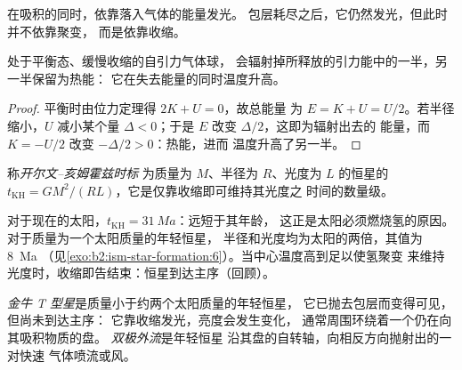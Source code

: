 \begin{omfigure}
\par{}
\end{omfigure}

在吸积的同时，依靠落入气体的能量发光。
包层耗尽之后，它仍然发光，但此时并不依靠聚变，
而是依靠收缩。

\begin{proposition}[收缩为年轻恒星提供能量]
\label{prop:b2:ism-star-formation:contraction}
处于平衡态、缓慢收缩的自引力气体球，
会辐射掉所释放的引力能中的一半，另一半保留为热能：
它在失去能量的同时温度升高。
\end{proposition}

\begin{proof}
平衡时由位力定理得 $2K + U = 0$，故总能量
为 $E = K + U = U/2$。若半径缩小，$U$ 减小某个量
$\Delta < 0$；于是 $E$ 改变 $\Delta/2$，这即为辐射出去的
能量，而 $K = -U/2$ 改变 $-\Delta/2 > 0$：热能，进而
温度升高了另一半。
\end{proof}

\begin{definition}\label{def:b2:ism-star-formation:kh-time}
称\emph{开尔文–亥姆霍兹时标}
为质量为 $M$、半径为 $R$、光度为 $L$ 的恒星的
$t_{\mathrm{KH}} = GM^2/(RL)$，它是仅靠收缩即可维持其光度之
时间的数量级。
\end{definition}

对于现在的太阳，$t_{\mathrm{KH}} = \qty{31}{Ma}$：远短于其年龄，
这正是太阳必须燃烧氢的原因。对于质量为一个太阳质量的年轻恒星，
半径和光度均为太阳的两倍，其值为 \qty{8}{Ma}
（见\cref{exo:b2:ism-star-formation:6}）。当中心温度高到足以使氢聚变
来维持光度时，收缩即告结束：恒星到达主序（回顾）。

\begin{definition}[金牛 T 型星、双极外流]\label{def:b2:ism-star-formation:t-tauri}
\emph{金牛 T 型星}是质量小于约两个太阳质量的年轻恒星，
它已抛去包层而变得可见，但尚未到达主序：
它靠收缩发光，亮度会发生变化，
通常周围环绕着一个仍在向其吸积物质的盘。
\emph{双极外流}是年轻恒星
沿其盘的自转轴，向相反方向抛射出的一对快速
气体喷流或风。
\end{definition}

